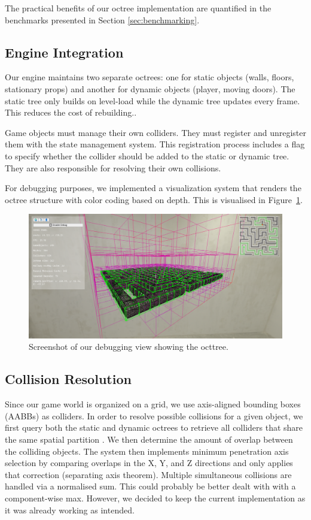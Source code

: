 \documentclass{article}
\begin{document}
The practical benefits of our octree implementation are quantified in the
benchmarks presented in Section \ref{sec:benchmarking}.

\subsection{Engine Integration}
Our engine maintains two separate octrees: one for static objects (walls,
floors, stationary props) and another for dynamic objects (player, moving
doors). The static tree only builds on level-load while the dynamic tree
updates every frame. This reduces the cost of rebuilding..

Game objects must manage their own colliders. They must register
and unregister them with the state management system. This registration process
includes a flag to specify whether the collider should be added to the static
or dynamic tree. They are also responsible for resolving their own collisions.

For debugging purposes, we implemented a visualization system that renders the
octree structure with color coding based on depth.  This is visualised in
Figure~\ref{fig:octree}.

\begin{figure}[H]
    \centering
    \includegraphics[width=\textwidth]{diagrams/octree.png}
    \caption{Screenshot of our debugging view showing the octtree.}
    \label{fig:octree}
\end{figure}

\subsection{Collision Resolution}

Since our game world is organized on a grid, we use axis-aligned bounding boxes
(AABBs) as colliders. In order to resolve possible collisions for a given
object, we first query both the static and dynamic octrees to retrieve all
colliders that share the same spatial partition . We then determine the amount
of overlap between the colliding objects. The system then implements minimum
penetration axis selection by comparing overlaps in the X, Y, and Z directions
and only applies that correction (separating axis theorem). Multiple
simultaneous collisions are handled via a normalised sum. This could probably
be better dealt with with a component-wise max. However, we decided to keep the
current implementation as it was already working as intended.
\end{document}
